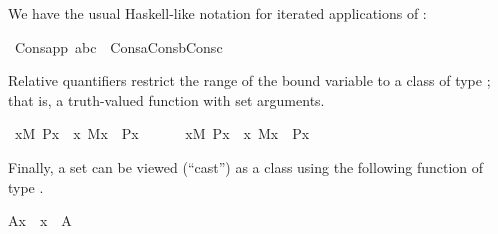 We have the usual Haskell-like notation for iterated applications
of :%
\begin{isabelle}
\isamarkupfalse%
\ Cons{\isacharunderscore}{\kern0pt}app{\isacharcolon}{\kern0pt}\ {\isachardoublequoteopen}{\isacharbrackleft}{\kern0pt}a{\isacharcomma}{\kern0pt}b{\isacharcomma}{\kern0pt}c{\isacharbrackright}{\kern0pt}\ {\isacharequal}{\kern0pt}\ Cons{\isacharparenleft}{\kern0pt}a{\isacharcomma}{\kern0pt}Cons{\isacharparenleft}{\kern0pt}b{\isacharcomma}{\kern0pt}Cons{\isacharparenleft}{\kern0pt}c{\isacharcomma}{\kern0pt}{\isacharbrackleft}{\kern0pt}{\isacharbrackright}{\kern0pt}{\isacharparenright}{\kern0pt}{\isacharparenright}{\kern0pt}{\isacharparenright}{\kern0pt}{\isachardoublequoteclose}%
\end{isabelle}

%
%
Relative quantifiers restrict the range of the bound variable to a
class  of type ; that is, a truth-valued function with
set arguments.%
\begin{isabelle}
\isamarkupfalse%
\ {\isachardoublequoteopen}{\isasymforall}x{\isacharbrackleft}{\kern0pt}M{\isacharbrackright}{\kern0pt}{\isachardot}{\kern0pt}\ P{\isacharparenleft}{\kern0pt}x{\isacharparenright}{\kern0pt}\ {\isasymequiv}\ {\isasymforall}x{\isachardot}{\kern0pt}\ M{\isacharparenleft}{\kern0pt}x{\isacharparenright}{\kern0pt}\ {\isasymlongrightarrow}\ P{\isacharparenleft}{\kern0pt}x{\isacharparenright}{\kern0pt}{\isachardoublequoteclose}\isanewline
\ \ \ \ \ \ {\isachardoublequoteopen}{\isasymexists}x{\isacharbrackleft}{\kern0pt}M{\isacharbrackright}{\kern0pt}{\isachardot}{\kern0pt}\ P{\isacharparenleft}{\kern0pt}x{\isacharparenright}{\kern0pt}\ {\isasymequiv}\ {\isasymexists}x{\isachardot}{\kern0pt}\ M{\isacharparenleft}{\kern0pt}x{\isacharparenright}{\kern0pt}\ {\isasymand}\ P{\isacharparenleft}{\kern0pt}x{\isacharparenright}{\kern0pt}{\isachardoublequoteclose}
\end{isabelle}
%
%
Finally, a set can be viewed (“cast”) as a class using the
following function of type .%
\begin{isabelle}%
{\isacharparenleft}{\kern0pt}{\isacharhash}{\kern0pt}{\isacharhash}{\kern0pt}A{\isacharparenright}{\kern0pt}{\isacharparenleft}{\kern0pt}x{\isacharparenright}{\kern0pt}\ {\isasymlongleftrightarrow}\ x\ {\isasymin}\ A%
\end{isabelle}%
